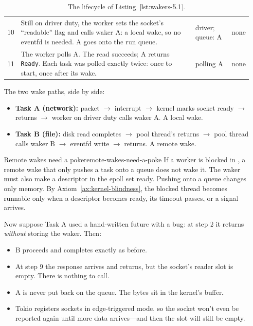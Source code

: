 \begin{table}[htbp]
\begin{tabularx}{\linewidth}{r Y >{\raggedright\arraybackslash}p{2.7cm} >{\raggedright\arraybackslash}p{2.5cm}}
        10 & Still on driver duty, the worker sets the socket's ``readable'' flag and calls waker A: a local wake, so no eventfd is needed. A goes onto the run queue. & driver; queue: A & none \\
        11 & The worker polls A. The read succeeds; A returns \texttt{Ready}. Each task was polled exactly twice: once to start, once after its wake. & polling A & none \\
        \bottomrule
    \end{tabularx}
    \caption{The lifecycle of Listing~\ref{lst:wakers-5.1}.}
    \label{tab:wakers-5.1}
\end{table}

The two wake paths, side by side:

\begin{itemize}
    \item \textbf{Task A (network):} packet $\rightarrow$ interrupt $\rightarrow$ kernel marks socket ready $\rightarrow$  returns $\rightarrow$ worker on driver duty calls waker A. A local wake.
    \item \textbf{Task B (file):} disk read completes $\rightarrow$ pool thread's  returns $\rightarrow$ pool thread calls waker B $\rightarrow$ eventfd write $\rightarrow$  returns. A remote wake.
\end{itemize}

\begin{lemma}{Remote wakes need a poke}{remote-wakes-need-a-poke}
    If a worker is blocked in , a remote wake that only pushes a task onto a queue does not wake it. The waker must also make a descriptor in the epoll set ready.
    \why Pushing onto a queue changes only memory. By Axiom~\ref{ax:kernel-blindness}, the blocked thread becomes runnable only when a descriptor becomes ready, its timeout passes, or a signal arrives.
\end{lemma}

Now suppose Task A used a hand-written future with a bug: at step 2 it returns  \emph{without} storing the waker. Then:

\begin{itemize}
    \item B proceeds and completes exactly as before.
    \item At step 9 the response arrives and  returns, but the socket's reader slot is empty. There is nothing to call.
    \item A is never put back on the queue. The bytes sit in the kernel's buffer.
    \item Tokio registers sockets in edge-triggered mode, so the socket won't even be reported again until more data arrives---and then the slot will still be empty.
\end{itemize}

